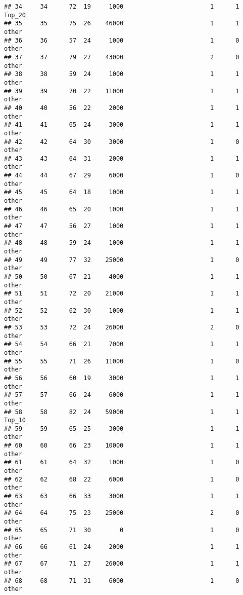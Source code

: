 \documentclass[
]{article}
\begin{document}
\begin{verbatim}
## 34     34      72  19     1000                        1      1   Top_20
## 35     35      75  26    46000                        1      1    other
## 36     36      57  24     1000                        1      0    other
## 37     37      79  27    43000                        2      0    other
## 38     38      59  24     1000                        1      1    other
## 39     39      70  22    11000                        1      1    other
## 40     40      56  22     2000                        1      1    other
## 41     41      65  24     3000                        1      1    other
## 42     42      64  30     3000                        1      0    other
## 43     43      64  31     2000                        1      1    other
## 44     44      67  29     6000                        1      0    other
## 45     45      64  18     1000                        1      1    other
## 46     46      65  20     1000                        1      1    other
## 47     47      56  27     1000                        1      1    other
## 48     48      59  24     1000                        1      1    other
## 49     49      77  32    25000                        1      0    other
## 50     50      67  21     4000                        1      1    other
## 51     51      72  20    21000                        1      1    other
## 52     52      62  30     1000                        1      1    other
## 53     53      72  24    26000                        2      0    other
## 54     54      66  21     7000                        1      1    other
## 55     55      71  26    11000                        1      0    other
## 56     56      60  19     3000                        1      1    other
## 57     57      66  24     6000                        1      1    other
## 58     58      82  24    59000                        1      1   Top_10
## 59     59      65  25     3000                        1      1    other
## 60     60      66  23    10000                        1      1    other
## 61     61      64  32     1000                        1      0    other
## 62     62      68  22     6000                        1      0    other
## 63     63      66  33     3000                        1      1    other
## 64     64      75  23    25000                        2      0    other
## 65     65      71  30        0                        1      0    other
## 66     66      61  24     2000                        1      1    other
## 67     67      71  27    26000                        1      1    other
## 68     68      71  31     6000                        1      0    other

\end{verbatim}
\end{document}
